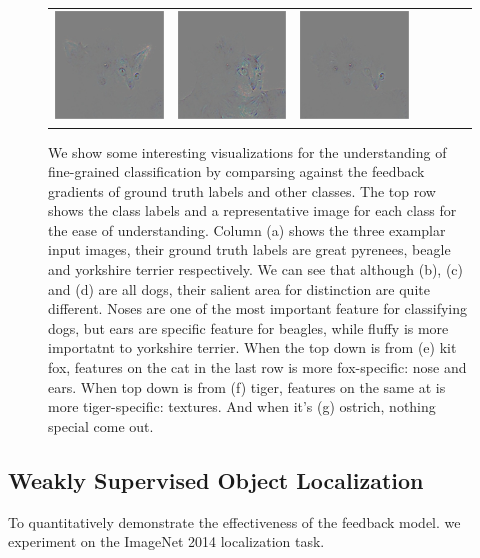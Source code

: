 \begin{figure}
\begin{center}
\begin{tabular}{ccccccc}
\includegraphics[width=0.14\linewidth,height=0.115\linewidth]{figs/class_compare/googlenet/soft/dog-cat3_diff_279} &
\includegraphics[width=0.14\linewidth,height=0.115\linewidth]{figs/class_compare/googlenet/soft/dog-cat3_diff_293} &
\includegraphics[width=0.14\linewidth,height=0.115\linewidth]{figs/class_compare/googlenet/soft/dog-cat3_diff_10} \\
\end{tabular}
\caption{We show some interesting visualizations for the understanding of fine-grained classification by comparsing against the feedback gradients of ground truth labels and other classes. The top row shows the class labels and a representative image for each class for the ease of understanding. Column (a) shows the three examplar input images, their ground truth labels are great pyrenees, beagle and yorkshire terrier respectively. We can see that although (b), (c) and (d) are all dogs, their salient area for distinction are quite different. Noses are one of the most important feature for classifying dogs, but ears are specific feature for beagles, while fluffy is more importatnt to yorkshire terrier. When the top down is from (e) kit fox, features on the cat in the last row is more fox-specific: nose and ears. When top down is from (f) tiger, features on the same at is more tiger-specific: textures. And when it's (g) ostrich, nothing special come out.}
\label{fig:class_compare}
\end{center}
\end{figure}

\subsection{Weakly Supervised Object Localization}
\label{subsec:localization}
To quantitatively demonstrate the effectiveness of the feedback model. we experiment on the ImageNet 2014 localization task.

